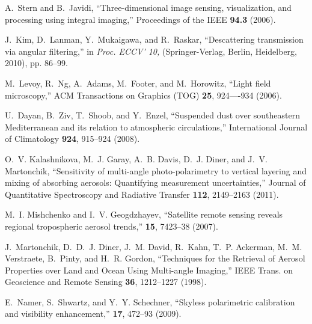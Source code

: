 \documentclass[10pt,letterpaper]{article}
\begin{document}


\begin{thebibliography}{10}
\newcommand{\enquote}[1]{``#1''}

A.~Stern and B.~Javidi, \enquote{{Three-dimensional image sensing,
  visualization, and processing using integral imaging},} Proceedings of the
  IEEE \textbf{94.3} (2006).

J.~Kim, D.~Lanman, Y.~Mukaigawa, and R.~Raskar, \enquote{{Descattering
  transmission via angular filtering},} in \emph{Proc. ECCV' 10,}
  (Springer-Verlag, Berlin, Heidelberg, 2010), pp. 86--99.

M.~Levoy, R.~Ng, A.~Adams, M.~Footer, and M.~Horowitz, \enquote{{Light field
  microscopy},} ACM Transactions on Graphics (TOG) \textbf{25}, 924----934
  (2006).

U.~Dayan, B.~Ziv, T.~Shoob, and Y.~Enzel, \enquote{{Suspended dust over
  southeastern Mediterranean and its relation to atmospheric circulations},}
  International Journal of Climatology \textbf{924}, 915--924 (2008).

O.~V. Kalashnikova, M.~J. Garay, A.~B. Davis, D.~J. Diner, and J.~V.
  Martonchik, \enquote{{Sensitivity of multi-angle photo-polarimetry to
  vertical layering and mixing of absorbing aerosols: Quantifying measurement
  uncertainties},} Journal of Quantitative Spectroscopy and Radiative Transfer
  \textbf{112}, 2149--2163 (2011).

M.~I. Mishchenko and I.~V. Geogdzhayev, \enquote{{Satellite remote sensing
  reveals regional tropospheric aerosol trends},} \opex \textbf{15},
  7423--38 (2007).

J.~Martonchik, D.~D.~J. Diner, J.~M. David, R.~Kahn, T.~P. Ackerman, M.~M.
  Verstraete, B.~Pinty, and H.~R. Gordon, \enquote{{Techniques for the
  Retrieval of Aerosol Properties over Land and Ocean Using Multi-angle
  Imaging},} IEEE Trans. on Geoscience and Remote Sensing \textbf{36},
  1212--1227 (1998).

E.~Namer, S.~Shwartz, and Y.~Y. Schechner, \enquote{{Skyless polarimetric
  calibration and visibility enhancement},} \opex \textbf{17}, 472--93
  (2009).


\end{thebibliography}
\end{document}
